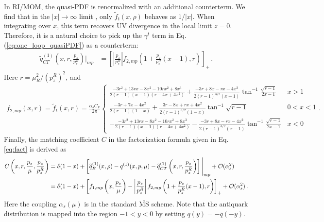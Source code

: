 In  RI/MOM, the  quasi-PDF is renormalized with  an additional counterterm. We find that in the $|x|\to\infty$  limit , only $\widetilde{f}_t(x,\rho)$ behaves as $1/|x|$. When integrating over $x$, this term  recovers   UV divergence in the local limit $z=0$. Therefore, it is a natural choice to pick up the  $\gamma^t$ term in Eq. (\ref{eq:one_loop_quasiPDF}) as a counterterm: 
\begin{align}
\widetilde{q}_{CT}^{(1)}\left(x,r,\frac{p_z}{p_z^R}\right)\bigg|_{mp}&=\left[\left|\frac{p_z}{p_z^R}\right|f_{2,mp}\left(1+\frac{p_z}{p_z^R}(x-1),r\right)\right]_+\,.
\end{align}
Here $r=\mu_R^2/(p_z^R)^2$, and
\begin{align}
f_{2,mp}(x,r)=\widetilde{f}_t(x,r)=\frac{\alpha_s C_F}{2\pi}\left\{
\begin{array}{lc}
\frac{-3r^2+13rx-8x^2-10rx^2+8x^3}{2(r-1)(x-1)(r-4x+4x^2)}+\frac{-3r+8x-rx-4x^2}{2(r-1)^{3/2}(x-1)}\tan^{-1}\frac{\sqrt{r-1}}{2x-1} & x>1\\
\frac{-3r+7x-4x^2}{2(r-1)(1-x)}+\frac{3r-8x+rx+4x^2}{2(r-1)^{3/2}(1-x)}\tan^{-1}\sqrt{r-1} & 0<x<1\\
-\frac{-3r^2+13rx-8x^2-10rx^2+8x^3}{2(r-1)(x-1)(r-4x+4x^2)}-\frac{-3r+8x-rx-4x^2}{2(r-1)^{3/2}(x-1)}\tan^{-1}\frac{\sqrt{r-1}}{2x-1} & x<0
\end{array} \right. .
\end{align}
Finally, the matching coefficient $C$ in  the factorization formula given in Eq.\eqref{eq:fact}  is derived  as
\begin{align}\label{eq:matching_coeff}
C\left(x,r,\frac{p_z}{\mu},\frac{p_z}{p_z^R}\right)&=\delta(1-x)+\left[\widetilde{q}^{(1)}_B(x,\rho)-q^{(1)}(x,p,\mu)-\widetilde{q}_{CT}^{(1)}\left(x,r,\frac{p_z}{p_z^R}\right)\right]\Bigg|_{mp}+{\cal O}(\alpha_s^2)\nonumber\\
&=\delta(1-x)+\left[f_{1,mp}\left(x,\frac{p_z}{\mu}\right)-\left|\frac{p_z}{p_z^R}\right|f_{2,mp}\left(1+\frac{p_z}{p_z^R}(x-1),r\right)\right]_+ +{\cal O}(\alpha_s^2)\,.
\end{align}
Here the coupling $\alpha_s(\mu)$ is in the standard $\overline{\text{MS}}$ scheme. Note that   the antiquark distribution is mapped  into the region $-1<y<0$ by setting $q(y)=-\bar{q}(-y)$.


